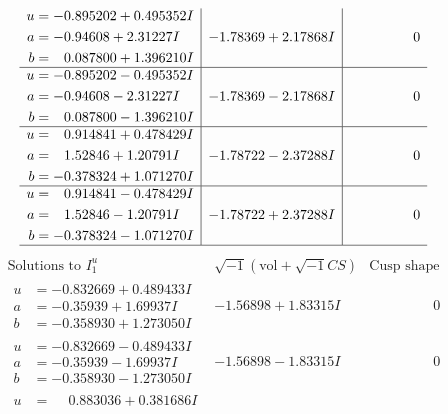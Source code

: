 \documentclass[1p]{elsarticle_modified}
\theoremstyle{definition}
\newcommand{\I}{\sqrt{-1}}
\begin{document}
$$\begin{array}{c|c|c}
\begin{aligned}
u &= -0.895202 + 0.495352 I \\
a &= -0.94608 + 2.31227 I \\
b &= \phantom{-}0.087800 + 1.396210 I\end{aligned}
 & -1.78369 + 2.17868 I & \phantom{-0.000000 } 0 \\ \hline\begin{aligned}
u &= -0.895202 - 0.495352 I \\
a &= -0.94608 - 2.31227 I \\
b &= \phantom{-}0.087800 - 1.396210 I\end{aligned}
 & -1.78369 - 2.17868 I & \phantom{-0.000000 } 0 \\ \hline\begin{aligned}
u &= \phantom{-}0.914841 + 0.478429 I \\
a &= \phantom{-}1.52846 + 1.20791 I \\
b &= -0.378324 + 1.071270 I\end{aligned}
 & -1.78722 - 2.37288 I & \phantom{-0.000000 } 0 \\ \hline\begin{aligned}
u &= \phantom{-}0.914841 - 0.478429 I \\
a &= \phantom{-}1.52846 - 1.20791 I \\
b &= -0.378324 - 1.071270 I\end{aligned}
 & -1.78722 + 2.37288 I & \phantom{-0.000000 } 0\\
 \hline 
 \end{array}$$\newpage$$\begin{array}{c|c|c}  
\text{Solutions to }I^u_{1}& \I (\text{vol} + \sqrt{-1}CS) & \text{Cusp shape}\\
 \hline 
\begin{aligned}
u &= -0.832669 + 0.489433 I \\
a &= -0.35939 + 1.69937 I \\
b &= -0.358930 + 1.273050 I\end{aligned}
 & -1.56898 + 1.83315 I & \phantom{-0.000000 } 0 \\ \hline\begin{aligned}
u &= -0.832669 - 0.489433 I \\
a &= -0.35939 - 1.69937 I \\
b &= -0.358930 - 1.273050 I\end{aligned}
 & -1.56898 - 1.83315 I & \phantom{-0.000000 } 0 \\ \hline\begin{aligned}
u &= \phantom{-}0.883036 + 0.381686 I \\

\end{aligned}
\end{array}$$
\end{document}
